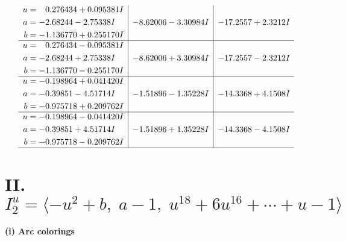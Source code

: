 \documentclass[1p]{elsarticle_modified}
\theoremstyle{definition}
\begin{document}
$$\begin{array}{c|c|c}
\begin{aligned}
u &= \phantom{-}0.276434 + 0.095381 I \\
a &= -2.68244 - 2.75338 I \\
b &= -1.136770 + 0.255170 I\end{aligned}
 & -8.62006 - 3.30984 I & -17.2557 + 2.3212 I \\ \hline\begin{aligned}
u &= \phantom{-}0.276434 - 0.095381 I \\
a &= -2.68244 + 2.75338 I \\
b &= -1.136770 - 0.255170 I\end{aligned}
 & -8.62006 + 3.30984 I & -17.2557 - 2.3212 I \\ \hline\begin{aligned}
u &= -0.198964 + 0.041420 I \\
a &= -0.39851 - 4.51714 I \\
b &= -0.975718 + 0.209762 I\end{aligned}
 & -1.51896 - 1.35228 I & -14.3368 + 4.1508 I \\ \hline\begin{aligned}
u &= -0.198964 - 0.041420 I \\
a &= -0.39851 + 4.51714 I \\
b &= -0.975718 - 0.209762 I\end{aligned}
 & -1.51896 + 1.35228 I & -14.3368 - 4.1508 I\\
 \hline 
 \end{array}$$\newpage\newpage\renewcommand{\arraystretch}{1}
\centering \section*{II. $I^u_{2}= \langle - u^2+b,\;a-1,\;u^{18}+6 u^{16}+\cdots+u-1 \rangle$}
\flushleft \textbf{(i) Arc colorings}\\
\end{document}
